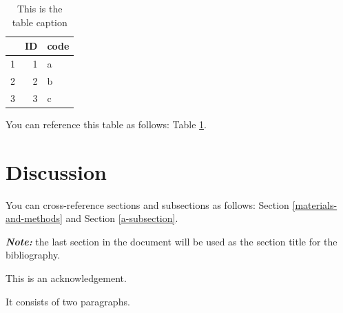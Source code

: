 \documentclass[12pt,halfline,a4paper,]{ouparticle}
\begin{document}
\begin{table}[ht]
\centering
\begin{tabular}{rrl}
  \hline
 & ID & code \\ 
  \hline
1 &   1 & a \\ 
  2 &   2 & b \\ 
  3 &   3 & c \\ 
   \hline
\end{tabular}
\caption{This is the table caption} 
\label{tab:tab1}
\end{table}

You can reference this table as follows: Table \ref{tab:tab1}.

\hypertarget{discussion}{%
\section{Discussion}\label{discussion}}

You can cross-reference sections and subsections as follows: Section
\ref{materials-and-methods} and Section \ref{a-subsection}.

\textbf{\emph{Note:}} the last section in the document will be used as
the section title for the bibliography.


\begin{notes}[Acknowledgements]
This is an acknowledgement.

It consists of two paragraphs.
\end{notes}


\renewcommand\refname{References}


\end{document}

